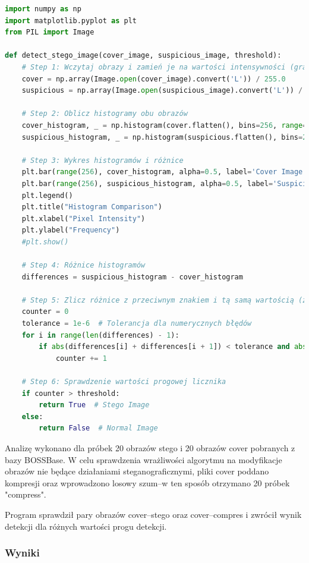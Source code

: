 \begin{lstlisting}[language=Python, caption=Steganaliza oparta na histogramach w Pythonie]
import numpy as np
import matplotlib.pyplot as plt
from PIL import Image

def detect_stego_image(cover_image, suspicious_image, threshold):
    # Step 1: Wczytaj obrazy i zamień je na wartości intensywności (grayscale)
    cover = np.array(Image.open(cover_image).convert('L')) / 255.0
    suspicious = np.array(Image.open(suspicious_image).convert('L')) / 255.0

    # Step 2: Oblicz histogramy obu obrazów
    cover_histogram, _ = np.histogram(cover.flatten(), bins=256, range=(0, 1))
    suspicious_histogram, _ = np.histogram(suspicious.flatten(), bins=256, range=(0, 1))

    # Step 3: Wykres histogramów i różnice
    plt.bar(range(256), cover_histogram, alpha=0.5, label='Cover Image Histogram')
    plt.bar(range(256), suspicious_histogram, alpha=0.5, label='Suspicious Image Histogram')
    plt.legend()
    plt.title("Histogram Comparison")
    plt.xlabel("Pixel Intensity")
    plt.ylabel("Frequency")
    #plt.show()

    # Step 4: Różnice histogramów
    differences = suspicious_histogram - cover_histogram

    # Step 5: Zlicz różnice z przeciwnym znakiem i tą samą wartością (z tolerancją)
    counter = 0
    tolerance = 1e-6  # Tolerancja dla numerycznych błędów
    for i in range(len(differences) - 1):
        if abs(differences[i] + differences[i + 1]) < tolerance and abs(differences[i]) > 0:
            counter += 1

    # Step 6: Sprawdzenie wartości progowej licznika
    if counter > threshold:
        return True  # Stego Image
    else:
        return False  # Normal Image
\end{lstlisting}

Analizę wykonano dla próbek 20 obrazów stego i 20 obrazów cover pobranych z bazy BOSSBase. W celu sprawdzenia 
wrażliwości algorytmu na modyfikacje obrazów nie będące działaniami steganograficznymi, pliki cover poddano 
kompresji oraz wprowadzono losowy szum--w ten sposób otrzymano 20 próbek "compress".

Program sprawdził pary obrazów cover--stego oraz cover--compres i zwrócił wynik detekcji dla różnych 
wartości progu detekcji.

\subsubsection{Wyniki}

